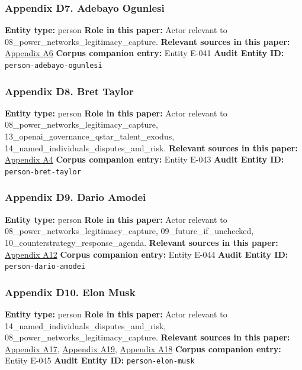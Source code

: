 \documentclass[
  american,
  11pt,
  letterpaper,
]{article}
\begin{document}
\subsubsection{Appendix D7. Adebayo
Ogunlesi}\label{ch-08-appendix-d7-adebayo-ogunlesi}

\textbf{Entity type:} person \textbf{Role in this paper:} Actor relevant
to 08\_power\_networks\_legitimacy\_capture. \textbf{Relevant sources in
this paper:}
\hyperref[ch-08-appendix-a6-openai-appoints-one-of-wall-street-s-most-powerful-dealmakers-to-its-board]{Appendix
A6} \textbf{Corpus companion entry:} Entity E-041 \textbf{Audit Entity
ID:} \texttt{person-adebayo-ogunlesi}

\subsubsection{Appendix D8. Bret
Taylor}\label{ch-08-appendix-d8-bret-taylor}

\textbf{Entity type:} person \textbf{Role in this paper:} Actor relevant
to 08\_power\_networks\_legitimacy\_capture,
13\_openai\_governance\_qstar\_talent\_exodus,
14\_named\_individuals\_disputes\_and\_risk. \textbf{Relevant sources in
this paper:}
\hyperref[ch-08-appendix-a4-openai-announces-new-members-to-board-of-directors]{Appendix
A4} \textbf{Corpus companion entry:} Entity E-043 \textbf{Audit Entity
ID:} \texttt{person-bret-taylor}

\subsubsection{Appendix D9. Dario
Amodei}\label{ch-08-appendix-d9-dario-amodei}

\textbf{Entity type:} person \textbf{Role in this paper:} Actor relevant
to 08\_power\_networks\_legitimacy\_capture, 09\_future\_if\_unchecked,
10\_counterstrategy\_response\_agenda. \textbf{Relevant sources in this
paper:}
\hyperref[ch-08-appendix-a12-the-adolescence-of-technology]{Appendix
A12} \textbf{Corpus companion entry:} Entity E-044 \textbf{Audit Entity
ID:} \texttt{person-dario-amodei}

\subsubsection{Appendix D10. Elon
Musk}\label{ch-08-appendix-d10-elon-musk}

\textbf{Entity type:} person \textbf{Role in this paper:} Actor relevant
to 14\_named\_individuals\_disputes\_and\_risk,
08\_power\_networks\_legitimacy\_capture. \textbf{Relevant sources in
this paper:}
\hyperref[ch-08-appendix-a17-musk-v-altman-4-24-cv-04722]{Appendix A17},
\hyperref[ch-08-appendix-a19-judge-denies-elon-musks-attempt-to-immediately-block-openais-conversion-to-for-profit-entity]{Appendix
A19},
\hyperref[ch-08-appendix-a18-judge-denies-elon-musk-s-request-to-block-openai-for-profit-conversion-but-welcomes-trial]{Appendix
A18} \textbf{Corpus companion entry:} Entity E-045 \textbf{Audit Entity
ID:} \texttt{person-elon-musk}
\end{document}

